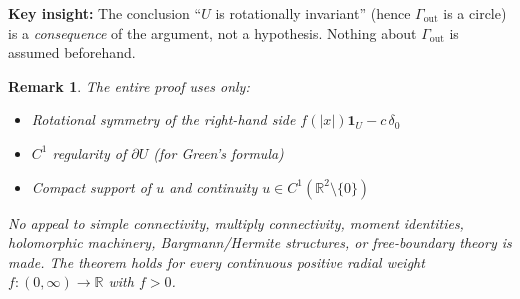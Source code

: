 \documentclass[11pt]{article}
\newtheorem{remark}[theorem]{Remark}
\newcommand{\R}{\mathbb R}
\newcommand{\1}{\mathbf 1}
\begin{document}
\noindent\textbf{Key insight:} The conclusion ``$U$ is rotationally invariant''
(hence $\Gamma_{\mathrm{out}}$ is a circle) is a \emph{consequence} of the argument,
not a hypothesis. Nothing about $\Gamma_{\mathrm{out}}$ is assumed beforehand.

\begin{remark}
The entire proof uses only:
\begin{itemize}
\item Rotational symmetry of the right-hand side $f(|x|)\mathbf 1_U-c\,\delta_0$
\item $C^1$ regularity of $\partial U$ (for Green's formula)
\item Compact support of $u$ and continuity $u\in C^1(\R^2\setminus\{0\})$
\end{itemize}
No appeal to simple connectivity, multiply connectivity, moment identities, holomorphic
machinery, Bargmann/Hermite structures, or free-boundary theory is made. The theorem holds
for \emph{every} continuous positive radial weight $f:(0,\infty)\to\R$ with $f>0$.
\end{remark}
\end{document}
